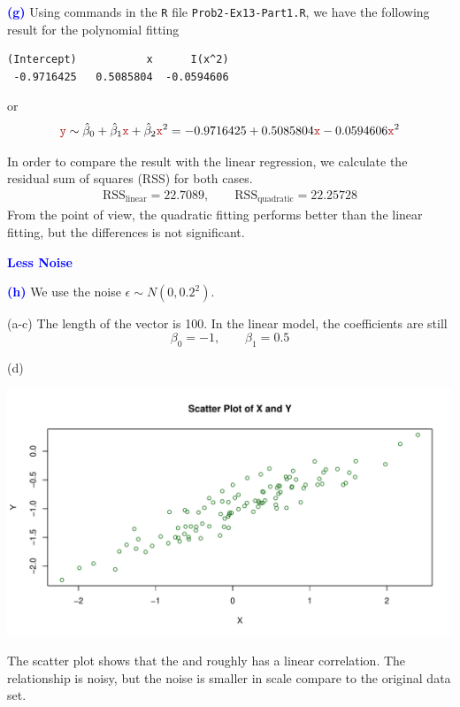\documentclass[a4paper,12pt]{article}
\newcommand{\code}[1]{\texttt{#1}}
\newcommand{\qnum}[1]{\noindent\textcolor{blue}{\textbf{(#1)}}}
\newcommand{\tx}[1]{\text{#1}}
\newcommand{\ba}{\[\begin{aligned}}
\newcommand{\ea}{\end{aligned}\]}
\begin{document}
\qnum{g}
Using commands in the \code{R} file \code{Prob2-Ex13-Part1.R}, we have the following result for the polynomial fitting 
\begin{verbatim}
(Intercept)           x      I(x^2) 
 -0.9716425   0.5085804  -0.0594606 
\end{verbatim}
or 
\[
    \yr \sim \hat{\beta}_0 + \hat{\beta}_1\xr + \hat{\beta}_2 \xr^2
    =
    -0.9716425
    + 0.5085804 \xr 
    -0.0594606 \xr^2 
\]

\newcommand{\rss}{\tx{RSS} }

In order to compare the result with the linear regression, we calculate the residual sum of squares (RSS) for both cases.
\ba 
    \rss_{\tx{linear}} = 22.7089,\qquad 
    \rss_{\tx{quadratic}} = 22.25728
\ea 
From the \rss point of view, the quadratic fitting performs better than the linear fitting, but the differences is not significant.
\bigskip\bigskip










\noindent\textcolor{blue}{\textbf{Less Noise}}\bigskip  

\qnum{h}
We use the noise $\epsilon\sim N(0, 0.2^2)$.

(a-c)
The length of the vector \yr is 100.
In the linear model, the coefficients are still
\[
    \beta_0 = -1,\qquad 
    \beta_1 = 0.5
\]

(d) 
\begin{center}
    \includegraphics[width=0.9\linewidth]{Images/Prob2-Ex13-h-d.pdf}
\end{center}

The scatter plot shows that the \xr and \yr roughly has a linear correlation. The relationship is noisy, but the noise is smaller in scale compare to the original data set.
\bigskip
\end{document}
